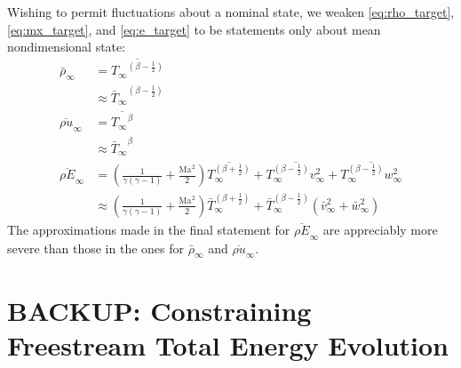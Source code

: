 \documentclass[letterpaper,11pt,nointlimits,reqno]{amsart}
\newcommand{\Mach}[1][]{\ensuremath{\mbox{Ma}_{#1}}}
\begin{document}
Wishing to permit fluctuations about a nominal state, we weaken
\eqref{eq:rho_target}, \eqref{eq:mx_target}, and \eqref{eq:e_target} to be
statements only about mean nondimensional state:
\begin{align}
   \bar{\rho}_\infty &= \overline{{T_\infty}^{\left(\beta-\frac{1}{2}\right)}}
\\
                     &\approx {\bar{T}_\infty}^{\left(\beta-\frac{1}{2}\right)}
\\
  \overline{\rho u}_\infty &= \overline{{T_\infty}^\beta}
\\
                           &\approx {\bar{T}_\infty}^\beta
\\
  \overline{\rho E}_\infty
         &= \left(  \frac{1}{\gamma\left(\gamma-1\right)}
                  + \frac{\Mach^2}{2} \right)
             \overline{T_\infty^{\left(\beta+\frac{1}{2}\right)}}
          + \overline{T_\infty^{\left(\beta-\frac{1}{2}\right)} v_\infty^2}
          + \overline{T_\infty^{\left(\beta-\frac{1}{2}\right)} w_\infty^2}
\\
         &\approx \left(  \frac{1}{\gamma\left(\gamma-1\right)}
                        + \frac{\Mach^2}{2} \right)
             \bar{T}_\infty^{\left(\beta+\frac{1}{2}\right)}
          +
             \bar{T}_\infty^{\left(\beta-\frac{1}{2}\right)}
             \left(\bar{v}_\infty^2 + \bar{w}_\infty^2\right)
\end{align}
The approximations made in the final statement for $\overline{\rho E}_\infty$
are appreciably more severe than those in the ones for $\bar{\rho}_\infty$ and
$\overline{\rho u}_\infty$.

\section{BACKUP: Constraining Freestream Total Energy Evolution}

\end{document}

